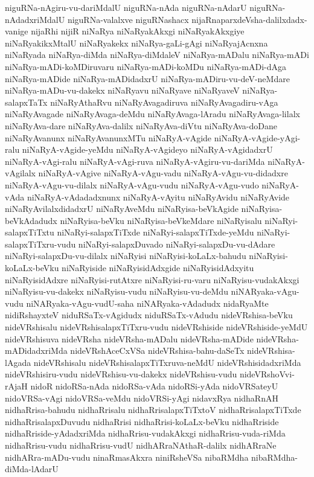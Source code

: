{niguRNa-nAgiru-vu-dariMdalU
niguRNa-nAda
niguRNa-nAdarU
niguRNa-nAdadxriMdalU
niguRNa-valalxve
niguRNashacx
nijaRnaparxdeVsha-dalilxdadx-vanige
nijaRhi
nijiR
niNaRya
niNaRyakAkxgi
niNaRyakAkxgiye
niNaRyakikxMtalU
niNaRyakekx
niNaRya-gaLi-gAgi
niNaRyajAcnxna
niNaRyada
niNaRya-diMda
niNaRya-diMdaleV
niNaRya-mADalu
niNaRya-mADi
niNaRya-mADi-koMDiruvaru
niNaRya-mADi-koMDu
niNaRya-mADi-dAga
niNaRya-mADide
niNaRya-mADidadxrU
niNaRya-mADiru-vu-deV-neMdare
niNaRya-mADu-vu-dakekx
niNaRyavu
niNaRyave
niNaRyaveV
niNaRya-salapxTaTx
niNaRyAthaRvu
niNaRyAvagadiruva
niNaRyAvagadiru-vAga
niNaRyAvagade
niNaRyAvaga-deMdu
niNaRyAvaga-lAradu
niNaRyAvaga-lilalx
niNaRyAva-dare
niNaRyAva-dalilx
niNaRyAva-diVtu
niNaRyAva-doDane
niNaRyAvanunx
niNaRyAvanunxMTu
niNaRyA-vAgide
niNaRyA-vAgide-yAgi-ralu
niNaRyA-vAgide-yeMdu
niNaRyA-vAgideyo
niNaRyA-vAgidadxrU
niNaRyA-vAgi-ralu
niNaRyA-vAgi-ruva
niNaRyA-vAgiru-vu-dariMda
niNaRyA-vAgilalx
niNaRyA-vAgive
niNaRyA-vAgu-vadu
niNaRyA-vAgu-vu-didadxre
niNaRyA-vAgu-vu-dilalx
niNaRyA-vAgu-vudu
niNaRyA-vAgu-vudo
niNaRyA-vAda
niNaRyA-vAdadadxnunx
niNaRyA-vAyitu
niNaRyAvidu
niNaRyAvide
niNaRyAvilalxdidadxrU
niNaRyAveMdu
niNaRyisa-beVkAgide
niNaRyisa-beVkAdadudx
niNaRyisa-beVku
niNaRyisa-beVkeMdare
niNaRyisalu
niNaRyi-salapxTiTxtu
niNaRyi-salapxTiTxde
niNaRyi-salapxTiTxde-yeMdu
niNaRyi-salapxTiTxru-vudu
niNaRyi-salapxDuvado
niNaRyi-salapxDu-vu-dAdare
niNaRyi-salapxDu-vu-dilalx
niNaRyisi
niNaRyisi-koLaLx-bahudu
niNaRyisi-koLaLx-beVku
niNaRyiside
niNaRyisidAdxgide
niNaRyisidAdxyitu
niNaRyisidAdxre
niNaRyisi-rutAtxre
niNaRyisi-ru-varu
niNaRyisu-vudakAkxgi
niNaRyisu-vu-dakekx
niNaRyisu-vudu
niNaRyisu-vu-deMdu
niNARyaka-vAgu-vudu
niNARyaka-vAgu-vudU-saha
niNARyaka-vAdadudx
nidaRyaMte
nidiRshayxteV
niduRSaTx-vAgidudx
niduRSaTx-vAdudu
nideVRshisa-beVku
nideVRshisalu
nideVRshisalapxTiTxru-vudu
nideVRshiside
nideVRshiside-yeMdU
nideVRshisuva
nideVRsha
nideVRsha-mADalu
nideVRsha-mADide
nideVRsha-mADidadxriMda
nideVRshAceCxVSa
nideVRshisa-bahu-daSeTx
nideVRshisa-lAgada
nideVRshisalu
nideVRshisalapxTiTxruva-neMdU
nideVRshisidadxriMda
nideVRshisiru-vudu
nideVRshisu-vu-dakekx
nideVRshisu-vudu
nideVRshoVvi-rAjaH
nidoR
nidoRSa-nAda
nidoRSa-vAda
nidoRSi-yAda
nidoVRSateyU
nidoVRSa-vAgi
nidoVRSa-veMdu
nidoVRSi-yAgi
nidavxRya
nidhaRnAH
nidhaRrisa-bahudu
nidhaRrisalu
nidhaRrisalapxTiTxtoV
nidhaRrisalapxTiTxde
nidhaRrisalapxDuvudu
nidhaRrisi
nidhaRrisi-koLaLx-beVku
nidhaRriside
nidhaRriside-yAdadxriMda
nidhaRrisu-vudakAkxgi
nidhaRrisu-vuda-riMda
nidhaRrisu-vudu
nidhaRrisu-vudU
nidhARraNAthaR-dalilx
nidhARraNe
nidhARra-mADu-vudu
ninaRmasAkxra
niniRsheVSa
nibaRMdha
nibaRMdha-diMda-lAdarU
}
